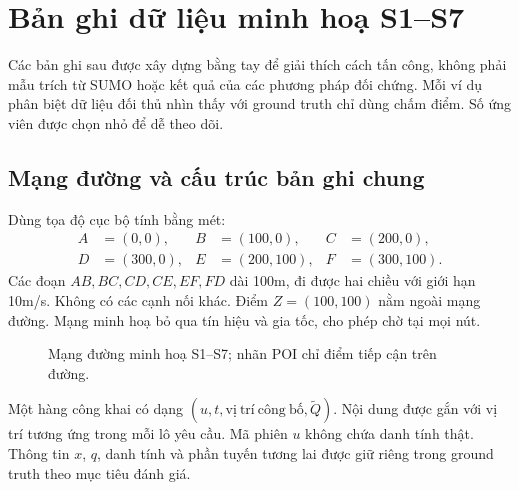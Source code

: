 \section{Bản ghi dữ liệu minh hoạ S1--S7}
\label{sec:scenario-records}

Các bản ghi sau được xây dựng bằng tay để giải thích cách tấn công, không phải mẫu trích từ SUMO hoặc kết quả của các phương pháp đối chứng. Mỗi ví dụ phân biệt dữ liệu đối thủ nhìn thấy với ground truth chỉ dùng chấm điểm. Số ứng viên được chọn nhỏ để dễ theo dõi.

\subsection{Mạng đường và cấu trúc bản ghi chung}

Dùng tọa độ cục bộ tính bằng mét:
\[
\begin{aligned}
A&=(0,0),&B&=(100,0),&C&=(200,0),\\
D&=(300,0),&E&=(200,100),&F&=(300,100).
\end{aligned}
\]
Các đoạn $AB,BC,CD,CE,EF,FD$ dài 100m, đi được hai chiều với giới hạn 10m/s. Không có các cạnh nối khác. Điểm $Z=(100,100)$ nằm ngoài mạng đường. Mạng minh hoạ bỏ qua tín hiệu và gia tốc, cho phép chờ tại mọi nút.

\begin{figure}[htbp]
\centering
{}
\caption{Mạng đường minh hoạ S1--S7; nhãn POI chỉ điểm tiếp cận trên đường.}
\label{fig:sample-network}
\end{figure}

Một hàng công khai có dạng $(u,t,\mathrm{vị\ trí\ công\ bố},\widetilde Q)$. Nội dung được gắn với vị trí tương ứng trong mỗi lô yêu cầu. Mã phiên $u$ không chứa danh tính thật. Thông tin $x$, $q$, danh tính và phần tuyến tương lai được giữ riêng trong ground truth theo mục tiêu đánh giá.

